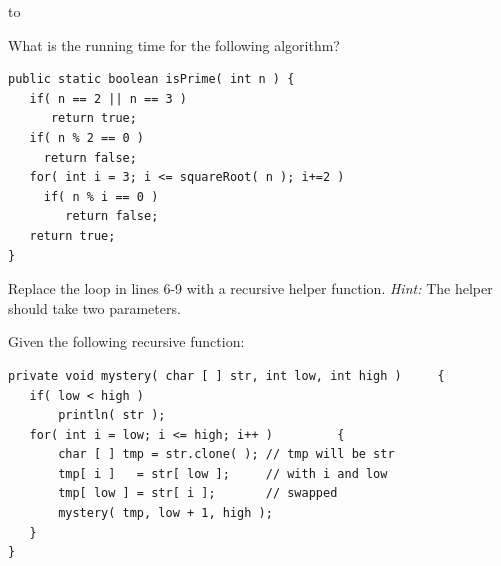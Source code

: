 \documentclass[11pt,letter]{exam}
\begin{document}
\begin{center} 
\end{center} 
\lstset{language=Java,numbers=left}

\vspace{0.1in} 
\hbox to \textwidth{Name:\enspace\hrulefill} 


\begin{questions}

\question[5] What is the running time for the following algorithm?
\vspace{0.5in}

\begin{lstlisting}
public static boolean isPrime( int n ) {
   if( n == 2 || n == 3 )
      return true;
   if( n % 2 == 0 )
     return false; 
   for( int i = 3; i <= squareRoot( n ); i+=2 )
     if( n % i == 0 )
        return false; 
   return true; 
}
\end{lstlisting}

\question[15] Replace the loop in lines 6-9 with a recursive helper
function.  \textit{Hint:} The helper should take two parameters.

\vspace{5in}

\question Given the following recursive function:
\begin{lstlisting}
private void mystery( char [ ] str, int low, int high )     {
   if( low < high )
       println( str );
   for( int i = low; i <= high; i++ )         {
       char [ ] tmp = str.clone( ); // tmp will be str
       tmp[ i ]   = str[ low ];     // with i and low
       tmp[ low ] = str[ i ];       // swapped
       mystery( tmp, low + 1, high );
   }     
} 
\end{lstlisting}
\end{questions}
\end{document}
